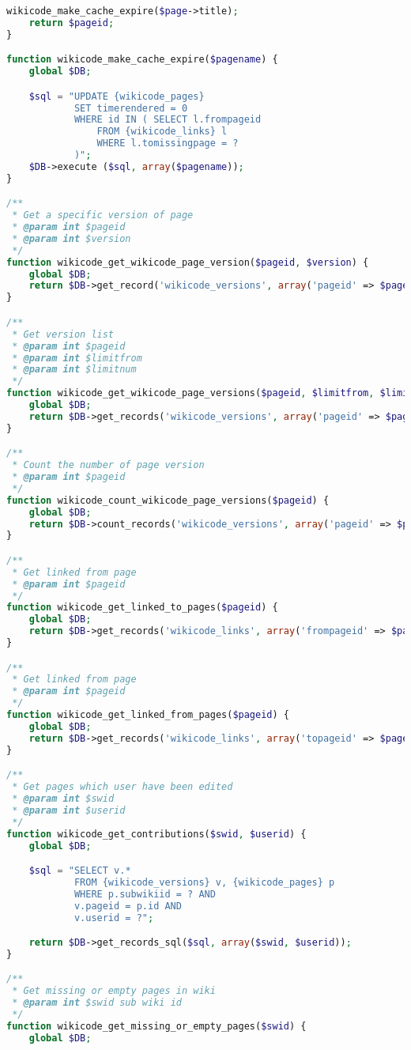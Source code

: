 \begin{lstlisting}[language=PHP]
    wikicode_make_cache_expire($page->title);
    return $pageid;
}

function wikicode_make_cache_expire($pagename) {
    global $DB;

    $sql = "UPDATE {wikicode_pages}
            SET timerendered = 0
            WHERE id IN ( SELECT l.frompageid
                FROM {wikicode_links} l
                WHERE l.tomissingpage = ?
            )";
    $DB->execute ($sql, array($pagename));
}

/**
 * Get a specific version of page
 * @param int $pageid
 * @param int $version
 */
function wikicode_get_wikicode_page_version($pageid, $version) {
    global $DB;
    return $DB->get_record('wikicode_versions', array('pageid' => $pageid, 'version' => $version));
}

/**
 * Get version list
 * @param int $pageid
 * @param int $limitfrom
 * @param int $limitnum
 */
function wikicode_get_wikicode_page_versions($pageid, $limitfrom, $limitnum) {
    global $DB;
    return $DB->get_records('wikicode_versions', array('pageid' => $pageid), 'version DESC', '*', $limitfrom, $limitnum);
}

/**
 * Count the number of page version
 * @param int $pageid
 */
function wikicode_count_wikicode_page_versions($pageid) {
    global $DB;
    return $DB->count_records('wikicode_versions', array('pageid' => $pageid));
}

/**
 * Get linked from page
 * @param int $pageid
 */
function wikicode_get_linked_to_pages($pageid) {
    global $DB;
    return $DB->get_records('wikicode_links', array('frompageid' => $pageid));
}

/**
 * Get linked from page
 * @param int $pageid
 */
function wikicode_get_linked_from_pages($pageid) {
    global $DB;
    return $DB->get_records('wikicode_links', array('topageid' => $pageid));
}

/**
 * Get pages which user have been edited
 * @param int $swid
 * @param int $userid
 */
function wikicode_get_contributions($swid, $userid) {
    global $DB;

    $sql = "SELECT v.*
            FROM {wikicode_versions} v, {wikicode_pages} p
            WHERE p.subwikiid = ? AND
            v.pageid = p.id AND
            v.userid = ?";

    return $DB->get_records_sql($sql, array($swid, $userid));
}

/**
 * Get missing or empty pages in wiki
 * @param int $swid sub wiki id
 */
function wikicode_get_missing_or_empty_pages($swid) {
    global $DB;


\end{lstlisting}
